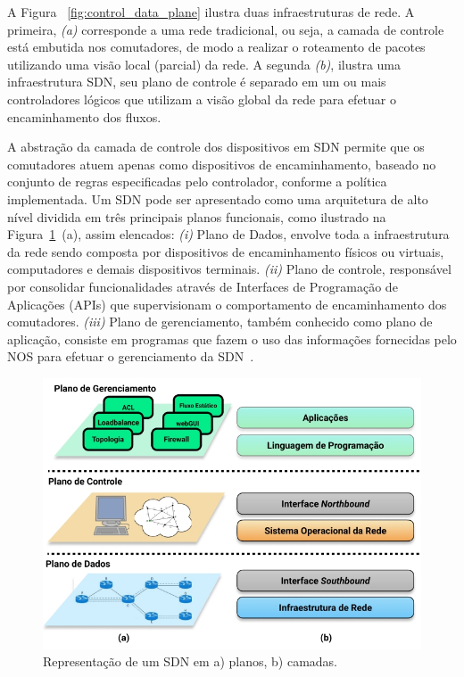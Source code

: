 A Figura ~\ref{fig:control_data_plane} ilustra duas infraestruturas de rede.
A primeira, \textit{(a)} corresponde a uma rede tradicional, ou seja, a camada de controle está embutida nos comutadores, de modo a realizar o roteamento de pacotes utilizando uma visão local (parcial) da rede. A segunda \textit{(b)}, ilustra uma infraestrutura SDN, seu plano de controle é separado em um ou mais controladores lógicos que utilizam a visão global da rede para efetuar o encaminhamento dos fluxos.

A abstração da camada de controle dos dispositivos em SDN permite que os comutadores atuem apenas como dispositivos de encaminhamento, baseado no conjunto de regras especificadas pelo controlador, conforme a política implementada. Um SDN pode ser apresentado como uma arquitetura de alto nível dividida em três principais planos funcionais, como ilustrado na Figura~\ref{fig:arquitetura_sdn}~(a), assim elencados: \textit{(i)} Plano de Dados,  envolve toda a infraestrutura da rede sendo composta por dispositivos de encaminhamento físicos ou virtuais, computadores e demais dispositivos terminais. 
\textit{(ii)} Plano de controle, responsável por consolidar funcionalidades através de Interfaces de Programação de Aplicações (APIs) que supervisionam o comportamento de encaminhamento dos comutadores. 
\textit{(iii)} Plano de gerenciamento, também conhecido como plano de aplicação, consiste em programas que fazem o uso das informações fornecidas pelo NOS para efetuar o gerenciamento da SDN~\cite{jarraya-2014}. 


\begin{figure}[!htb]
	\caption{\label{fig:arquitetura_sdn} Representação de um SDN em a) planos, b) camadas.}
	\begin{center}
	    \includegraphics[scale=0.60]{imagens/planos_camadas.jpg}
	\end{center}
\end{figure}

